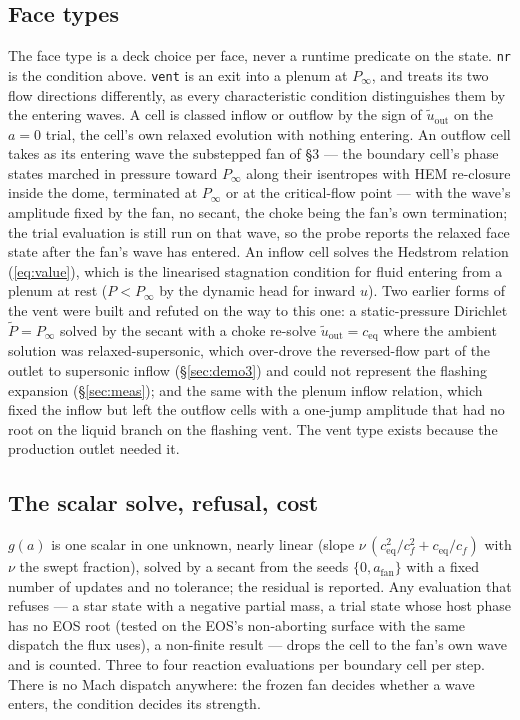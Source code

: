 \documentclass[11pt,a4paper]{article}
\newcommand{\code}[1]{\texttt{\small #1}}
\newcommand{\uout}{u_{\mathrm{out}}}
\newcommand{\Pinf}{P_\infty}
\newcommand{\ceq}{c_{\mathrm{eq}}}
\newcommand{\cf}{c_{f}}
\begin{document}
\subsection{Face types}

The face type is a deck choice per face, never a runtime predicate on
the state.  \code{nr} is the condition above.  \code{vent} is an exit
into a plenum at $\Pinf$, and treats its two flow directions
differently, as every characteristic condition distinguishes them by
the entering waves.  A cell is classed inflow or outflow by the sign of
$\tilde\uout$ on the $a = 0$ trial, the cell's own relaxed evolution
with nothing entering.  An outflow cell takes as its entering wave the
substepped fan of \S3 --- the boundary cell's phase states marched in
pressure toward $\Pinf$ along their isentropes with HEM re-closure
inside the dome, terminated at $\Pinf$ or at the critical-flow point ---
with the wave's amplitude fixed by the fan, no secant, the choke being
the fan's own termination; the trial evaluation is still run on that
wave, so the probe reports the relaxed face state after the fan's wave
has entered.  An inflow cell solves the Hedstrom relation
(\ref{eq:value}), which is the linearised stagnation condition for
fluid entering from a plenum at rest ($P < \Pinf$ by the dynamic head
for inward $u$).  Two earlier forms of the vent were built and refuted
on the way to this one: a static-pressure Dirichlet $\tilde P = \Pinf$
solved by the secant with a choke re-solve $\tilde\uout = \ceq$ where
the ambient solution was relaxed-supersonic, which over-drove the
reversed-flow part of the outlet to supersonic inflow (\S\ref{sec:demo3})
and could not represent the flashing expansion (\S\ref{sec:meas}); and
the same with the plenum inflow relation, which fixed the inflow but
left the outflow cells with a one-jump amplitude that had no root on
the liquid branch on the flashing vent.  The vent type exists because
the production outlet needed it.

\subsection{The scalar solve, refusal, cost}

$g(a)$ is one scalar in one unknown, nearly linear (slope
$\nu\,(\ceq^2/\cf^2 + \ceq/\cf)$ with $\nu$ the swept fraction), solved
by a secant from the seeds $\{0, a_{\mathrm{fan}}\}$ with a fixed number
of updates and no tolerance; the residual is reported.  Any evaluation
that refuses --- a star state with a negative partial mass, a trial
state whose host phase has no EOS root (tested on the EOS's
non-aborting surface with the same dispatch the flux uses), a non-finite
result --- drops the cell to the fan's own wave and is counted.  Three to
four reaction evaluations per boundary cell per step.  There is no Mach
dispatch anywhere: the frozen fan decides whether a wave enters, the
condition decides its strength.
\end{document}
